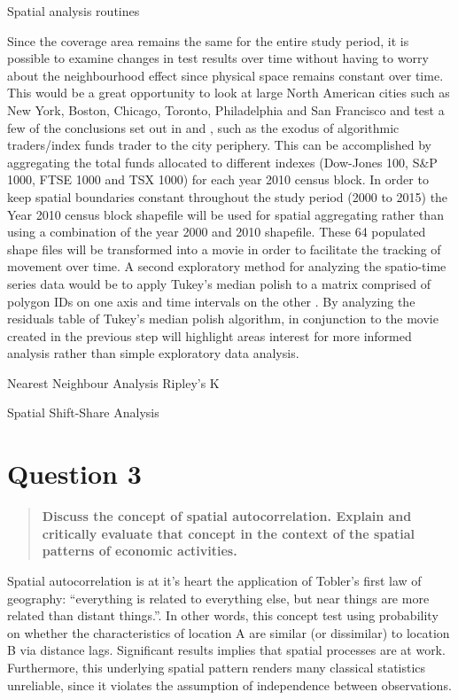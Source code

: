 \documentclass[12pt,letterpaper,notitlepage,onecolumn,final,openbib]{article}
\begin{document}
Spatial analysis routines 

Since the coverage area remains the same for the entire study period, it is possible to examine changes in test results over time without having to worry about the neighbourhood effect since physical space remains constant over time.  This would be a great opportunity to look at large North American cities such as New York, Boston, Chicago, Toronto, Philadelphia and San Francisco and test a few of the conclusions set out in  and , such as the exodus of algorithmic traders/index funds trader to the city periphery.  This can be accomplished by aggregating the total funds allocated to different indexes (Dow-Jones 100, S\&P 1000, FTSE 1000 and TSX 1000) for each year 2010 census block.  In order to keep spatial boundaries constant throughout the study period (2000 to 2015) the Year 2010 census block shapefile will be used for spatial aggregating rather than using a combination of the year 2000 and 2010 shapefile. These 64 populated shape files will be transformed into a movie in order to facilitate the tracking of movement over time.  A second exploratory method for analyzing the spatio-time series data would be to apply Tukey's median polish to a matrix comprised of polygon IDs on one axis and time intervals on the other \cite{tukey77,STMedianPolish}.  By analyzing the residuals table of Tukey's median polish algorithm, in conjunction to the movie created in the previous step will highlight areas interest for more informed analysis rather than simple exploratory data analysis.   



   
Nearest Neighbour Analysis 
Ripley's K

Spatial Shift-Share Analysis \cite{ShiftShare2008}


\section{Question 3}
\begin{quotation}
\textbf{Discuss the concept of spatial autocorrelation. Explain and critically evaluate that concept in the context of the spatial patterns of economic activities.}
\end{quotation}

Spatial autocorrelation is at it's heart the application of Tobler's first law of geography: ``everything is related to everything else, but near things are more related than distant things.''\cite[page  236]{toblera1970}.  In other words, this concept test using probability on whether the characteristics of location A are similar (or dissimilar) to location B via distance lags.   Significant results implies that spatial processes are at work.  Furthermore, this underlying spatial pattern renders many classical statistics unreliable, since it violates the assumption of independence between observations\cite{fischer2009handbook}. 
\end{document}
